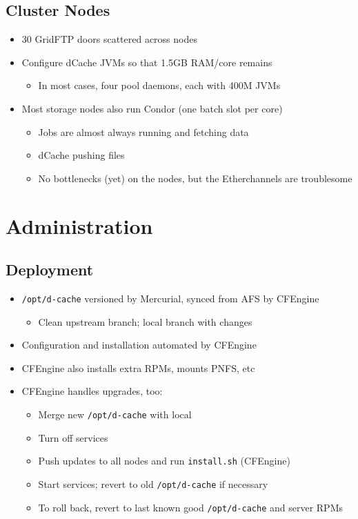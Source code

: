 \documentclass{beamer}
\begin{document}
\subsection{Cluster Nodes}
\begin{frame}
\begin{itemize}
	\item 30 GridFTP doors scattered across nodes
	\item Configure dCache JVMs so that 1.5GB RAM/core remains
	\begin{itemize}
		\item In most cases, four pool daemons, each with 400M JVMs
	\end{itemize}
	\item Most storage nodes also run Condor (one batch slot per core)
	\begin{itemize}
		\item Jobs are almost always running and fetching data
		\item dCache pushing files
		\item No bottlenecks (yet) on the nodes, but the Etherchannels are troublesome
	\end{itemize}
\end{itemize}
\end{frame}

\section{Administration}
\subsection{Deployment}
\begin{frame}
\begin{itemize}
	\item {\tt /opt/d-cache} versioned by Mercurial, synced from AFS by CFEngine
	\begin{itemize}
		\item Clean upstream branch; local branch with changes
	\end{itemize}
	\item Configuration and installation automated by CFEngine
	\item CFEngine also installs extra RPMs, mounts PNFS, etc
	\item CFEngine handles upgrades, too:
	\begin{itemize}
		\item Merge new {\tt /opt/d-cache} with local
		\item Turn off services
		\item Push updates to all nodes and run {\tt install.sh} (CFEngine)
		\item Start services; revert to old {\tt /opt/d-cache} if necessary
		\item To roll back, revert to last known good {\tt /opt/d-cache} and server RPMs
	\end{itemize}
\end{itemize}
\end{frame}
\end{document}
